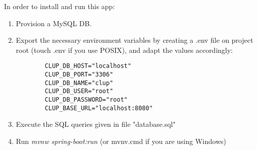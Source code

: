 In order to install and run this app:\\
\begin{enumerate}
    \item Provision a MySQL DB.
    \item Export the necessary environment variables by creating a .env file on project root (touch .env if you use POSIX), and adapt the values accordingly:\\
    \begin{verbatim}
        CLUP_DB_HOST="localhost"
        CLUP_DB_PORT="3306"
        CLUP_DB_NAME="clup"
        CLUP_DB_USER="root"
        CLUP_DB_PASSWORD="root"
        CLUP_BASE_URL="localhost:8080"
    \end{verbatim}
    \item Execute the SQL queries given in file "database.sql"
    \item Run \textit{mvnw spring-boot:run} (or mvnv.cmd if you are using Windows)
\end{enumerate}
